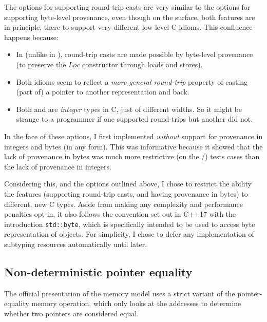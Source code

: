 The options for supporting round-trip casts are very similar to the options for
supporting byte-level provenance, even though on the surface, both features are
in principle, there to support very different low-level C idioms. This confluence
happens because:
\begin{itemize}
    \item In  (unlike in ), round-trip casts are made
        possible by byte-level provenance (to preserve the $\mathit{Loc}$
        constructor through loads and stores).
    \item Both idioms seem to reflect a \emph{more general round-trip} property
        of casting (part of) a pointer to another representation and back.
    \item Both  and  are \emph{integer} types in
        C, just of different widths. So it might be strange to a programmer if
        one supported round-trips but another did not.
\end{itemize}

In the face of these options, I first implemented  \emph{without}
support for provenance in integers and bytes (in any form). This was
informative because it showed that the lack of provenance in bytes was much
more restrictive (on the /) tests cases than the lack
of provenance in integers.

Considering this, and the options outlined above, I chose to restrict the
ability the features (supporting round-trip casts, and having provenance in
bytes) to different, new C types. Aside from making any complexity and
performance penalties opt-in, it also follows the convention set out in C++17
with the introduction \texttt{std::byte}, which is specifically
intended to be used to access byte representation of objects. For simplicity, I
chose to defer any implementation of subtyping resources automatically until
later.

\subsection{Non-deterministic pointer equality}\label{subsec:non-det-ptr-eq}

The official presentation of the  memory model uses a strict variant of
the pointer-equality memory operation, which only looks at the addresses to
determine whether two pointers are considered equal.

